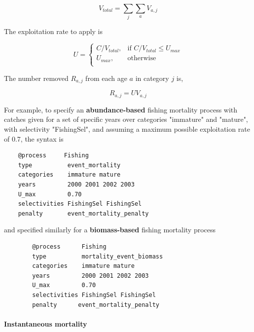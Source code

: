 \begin{equation}
  V_{total}  = \sum\limits_j {\sum\limits_a {V_{a,j}}}
\end{equation}

The exploitation rate to apply is

\begin{equation}
U = \begin{cases}
  C/V_{total}, & \text{if $C/V_{total} \leq U_{max}$} \\
  U_{max}, & \text{otherwise}\\
  \end{cases}
\end{equation}

The number removed $R_{a,j}$ from each age $a$ in category $j$ is,

\begin{equation}
  R_{a,j} = U V_{a,j}
\end{equation}

For example, to specify an \textbf{abundance-based} fishing mortality process with catches given for a set of specific years over categories "immature" and "mature", with selectivity "FishingSel", and assuming a maximum possible exploitation rate of 0.7, the syntax is

{\small{\begin{verbatim}
	@process     Fishing
	type          event_mortality
	categories    immature mature
	years         2000 2001 2002 2003
	U_max         0.70
	selectivities FishingSel FishingSel
	penalty       event_mortality_penalty
	\end{verbatim}}}

and specified similarly for a \textbf{biomass-based} fishing mortality process

{\small{\begin{verbatim}
		@process      Fishing
		type          mortality_event_biomass
		categories    immature mature
		years         2000 2001 2002 2003
		U_max         0.70
		selectivities FishingSel FishingSel
		penalty      event_mortality_penalty
		\end{verbatim}}}

\paragraph{Instantaneous mortality}\label{sec:Process-MortalityInstantaneous}\label{sec:Process-MortalityInstantaneousEventBiomass}\label{sec:Process-MortalityInstantaneousEvent}

